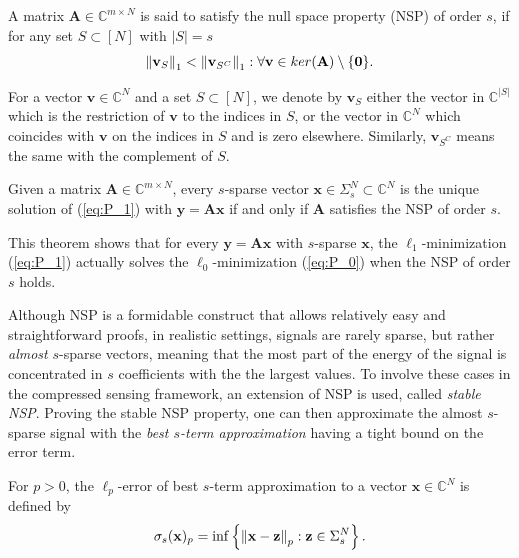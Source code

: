 \begin{definition}[NSP]
A matrix $\mathbf{A} \in \mathbb{C}^{m \times N}$ is said to satisfy the null space property (NSP) of order $s$, if for any set $S \subset [N]$ with $|S| = s$
\[\left\lVert\mathbf{v}_S\right\rVert_1 < \left\lVert\mathbf{v}_{S^C}\right\rVert_1 : \forall \mathbf{v} \in ker(\mathbf{A})  \setminus \{\mathbf{0}\}.\]
\end{definition}

\begin{notation}
For a vector $\mathbf{v} \in \mathbb{C}^N$ and a set $S \subset [N]$, we denote by $\mathbf{v}_S$ either the vector in $\mathbb{C}^{|S|}$ which is the restriction of $\mathbf{v}$ to the indices in $S$, or the vector in $\mathbb{C}^N$ which coincides with $\mathbf{v}$ on the indices in $S$ and is zero elsewhere. Similarly, $\mathbf{v}_{S^C}$ means the same with the complement of $S$.
\end{notation}

\begin{theorem}
Given a matrix $\mathbf{A} \in \mathbb{C}^{m \times N}$, every $s$-sparse vector $\mathbf{x} \in \Sigma_s^N \subset \mathbb{C}^N$ is the unique solution of (\ref{eq:P_1}) with $\mathbf{y} = \mathbf{Ax}$ if and only if $\mathbf{A}$ satisfies the NSP of order $s$.
\end{theorem}

\begin{remark}
This theorem shows that for every $\mathbf{y} = \mathbf{Ax}$ with $s$-sparse $\mathbf{x}$, the $\ell_1$-minimization (\ref{eq:P_1}) actually solves the $\ell_0$-minimization (\ref{eq:P_0}) when the NSP of order $s$ holds.
\end{remark}

Although NSP is a formidable construct that allows relatively easy and straightforward proofs, in realistic settings, signals are rarely sparse, but rather \textit{almost} $s$-sparse vectors, meaning that the most part of the energy of the signal is concentrated in $s$ coefficients with the the largest values. To involve these cases in the compressed sensing framework, an extension of NSP is used, called \textit{stable NSP}. Proving the stable NSP property, one can then approximate the almost $s$-sparse signal with the \textit{best $s$-term approximation} having a tight bound on the error term.

\begin{definition}
For $p > 0$, the $\ell_p$-error of best $s$-term approximation to a vector $\mathbf{x} \in \mathbb{C}^N$ is defined by
\[\sigma_s(\mathbf{x})_p = \inf\left\{\left\lVert\mathbf{x} - \mathbf{z}\right\rVert_p : \mathbf{z} \in \Sigma_s^N\right\}.\]
\end{definition}

